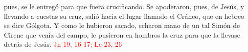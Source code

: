 pues, se le entregó para que fuera crucificando. Se apoderaron, pues, de Jesús, y llevando a cuestas su cruz, 
salió hacia el lugar llamado el Cráneo, que en hebreo se dice Gólgota. Y como le hubieron sacado, echaron mano de un tal Simón de Cirene que venía del campo, 
le pusieron en hombros la cruz para que la llevase detrás de Jesús. \textcolor{red}{Jn 19, 16-17; Lc 23, 26}